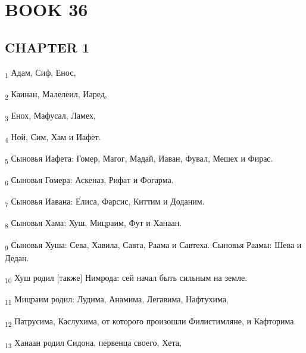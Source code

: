 \section{BOOK 36}
\subsection{CHAPTER 1}
\begin{tcolorbox}
\textsubscript{1} Адам, Сиф, Енос,
\end{tcolorbox}
\begin{tcolorbox}
\textsubscript{2} Каинан, Малелеил, Иаред,
\end{tcolorbox}
\begin{tcolorbox}
\textsubscript{3} Енох, Мафусал, Ламех,
\end{tcolorbox}
\begin{tcolorbox}
\textsubscript{4} Ной, Сим, Хам и Иафет.
\end{tcolorbox}
\begin{tcolorbox}
\textsubscript{5} Сыновья Иафета: Гомер, Магог, Мадай, Иаван, Фувал, Мешех и Фирас.
\end{tcolorbox}
\begin{tcolorbox}
\textsubscript{6} Сыновья Гомера: Аскеназ, Рифат и Фогарма.
\end{tcolorbox}
\begin{tcolorbox}
\textsubscript{7} Сыновья Иавана: Елиса, Фарсис, Киттим и Доданим.
\end{tcolorbox}
\begin{tcolorbox}
\textsubscript{8} Сыновья Хама: Хуш, Мицраим, Фут и Ханаан.
\end{tcolorbox}
\begin{tcolorbox}
\textsubscript{9} Сыновья Хуша: Сева, Хавила, Савта, Раама и Савтеха. Сыновья Раамы: Шева и Дедан.
\end{tcolorbox}
\begin{tcolorbox}
\textsubscript{10} Хуш родил [также] Нимрода: сей начал быть сильным на земле.
\end{tcolorbox}
\begin{tcolorbox}
\textsubscript{11} Мицраим родил: Лудима, Анамима, Легавима, Нафтухима,
\end{tcolorbox}
\begin{tcolorbox}
\textsubscript{12} Патрусима, Каслухима, от которого произошли Филистимляне, и Кафторима.
\end{tcolorbox}
\begin{tcolorbox}
\textsubscript{13} Ханаан родил Сидона, первенца своего, Хета,
\end{tcolorbox}
